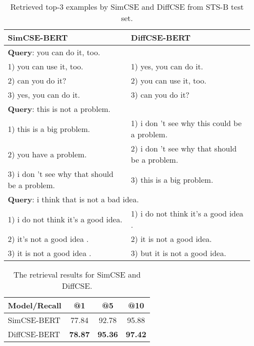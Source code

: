 \documentclass[11pt]{article}
\newcommand{\ba}{\xspace}
\newcommand\tf[1]{\textbf{#1}}
\begin{document}
\begin{table}[t]
    \centering
    \scriptsize
    \begin{tabular}{p{3.5cm}|p{3.5cm}}
        \toprule
        \tf{SimCSE-BERT\ba} & \tf{DiffCSE-BERT\ba}  \\
        \midrule
        \multicolumn{2}{l}{\tf{Query}: you can do it, too.} \\
        \midrule
        1) you can use it, too. & 1) yes, you can do it. \\
        2) can you do it? & 2) you can use it, too. \\
        3) yes, you can do it. & 3) can you do it? \\
        \midrule
        \multicolumn{2}{l}{\tf{Query}: this is not a problem.} \\
        \midrule
        1) this is a big problem. & 1) i don 't see why this could be a problem. \\
        2) you have a problem. & 2) i don 't see why that should be a problem. \\
        3) i don 't see why that should be a problem. & 3) this is a big problem. \\
        \midrule
        \multicolumn{2}{l}{\tf{Query}: i think that is not a bad idea.} \\
        \midrule
        1) i do not think it's a good idea. & 1) i do not think it's a good idea . \\
        2) it's not a good idea . & 2) it is not a good idea. \\
        3) it is not a good idea . & 3) but it is not a good idea. \\
        \bottomrule
    \end{tabular}
    \vspace{-2mm}
    \caption{Retrieved top-3 examples by SimCSE and DiffCSE from STS-B test set. }
    \label{tab:top-3}
    \vspace{-3mm}
\end{table}

\begin{table}[t]
    \begin{center}
    \centering
    \small
    \begin{tabular}{l|ccc}
    \toprule
       \bf Model/Recall & \bf @1 & \bf @5 & \bf @10 \\
    \midrule
        SimCSE-BERT\ba & 77.84 & 92.78 & 95.88 \\
        DiffCSE-BERT\ba & \bf 78.87 & \bf 95.36 & \bf 97.42 \\
    \bottomrule
    \end{tabular}
    \end{center}
    \vspace{-3mm}
    \caption{
        The retrieval results for SimCSE and DiffCSE.
    }
    \label{tab:retrieval}
    \vspace{-2mm}
\end{table}
 
\end{document}

